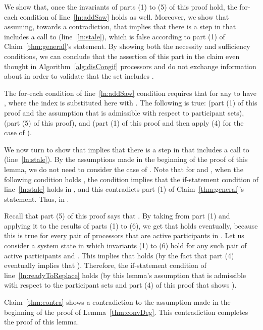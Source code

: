 \documentclass[11pt]{article}
\newenvironment{proof}{\noindent{\bf Proof.}}{\hfill}
\begin{document}
\begin{proof}
\begin{proof}
 We show that, once the invariants of parts (1) to (5) of this proof hold, the for-each condition of line~\ref{ln:addSaw} holds as well. Moreover, we show that assuming, towards a contradiction, that  implies that there is a step in  that includes a call to   (line~\ref{ln:stale}), which is false according to part (1) of Claim~\ref{thm:general}'s statement. 
By showing both the necessity and sufficiency conditions, we can conclude that the assertion of this part in the claim even thought in Algorithm~\ref{alg:disCongif} processors  and  do not exchange  information about  in order to validate that the set  includes . 

The for-each condition of line~\ref{ln:addSaw} condition requires that for any  to have , where the index  is substituted here with . The following is true:   (part (1) of this proof and the assumption that  is admissible with respect to participant sets),  (part (5) of this proof), and  (part (1) of this proof and then apply (4) for the case of ).

We now turn to show that  implies that there is a step in  that includes a call to   (line~\ref{ln:stale}).
By the assumptions made in the beginning of the proof of this lemma, we do not need to consider the case of . Note that for  and , when the following condition holds , the condition  implies that the if-statement condition of line~\ref{ln:stale} holds in , and this contradicts part (1) of Claim~\ref{thm:general}'s statement. Thus,  in . 


 Recall that part (5) of this proof says that . By taking   from part (1) and applying it to the results of parts (1) to (6), we get that  holds eventually, because this is true for every pair of processors  that are active participants in . Let us consider a system state in which invariants (1) to (6) hold for any such pair of active participants  and .
This implies that  holds (by the fact that part (4) eventually implies that ). Therefore, the if-statement condition of line~\ref{ln:readyToReplace} holds (by this lemma's assumption that  is admissible with respect to the participant sets and part (4) of this proof that shows ).
\end{proof}

\medskip


Claim~\ref{thm:contra} shows a contradiction to the assumption made in the beginning of the proof of Lemma~\ref{thm:convDeg}. 
This contradiction completes the proof of this lemma.


\end{proof}
\end{document}
